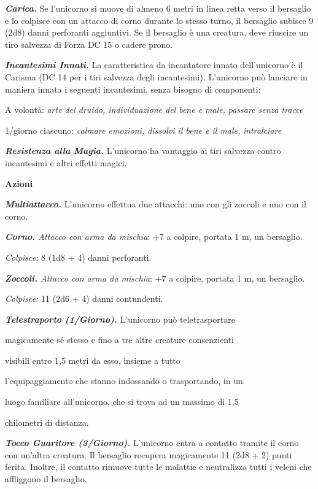 \begin{multicols}{2}
\emph{\textbf{Carica.}} Se l'unicorno si muove di almeno 6 metri in
linea retta verso il bersaglio e lo colpisce con un attacco di corno
durante lo stesso turno, il bersaglio subisce 9 (2d8) danni perforanti
aggiuntivi. Se il bersaglio è una creatura, deve riuscire un tiro
salvezza di Forza DC 15 o cadere prono.

\emph{\textbf{Incantesimi Innati.}} La caratteristica da incantatore
innato dell'unicorno è il Carisma (DC 14 per i tiri salvezza degli
incantesimi). L'unicorno può lanciare in maniera innata i seguenti
incantesimi, senza bisogno di componenti:

A volontà: \emph{arte del druido, individuazione del bene e male,}
\emph{passare senza tracce}

1/giorno ciascuno: \emph{calmare emozioni, dissolvi il bene e il male,}
\emph{intralciare}

\emph{\textbf{Resistenza alla Magia.}} L'unicorno ha vantaggio ai tiri
salvezza contro incantesimi e altri effetti magici.

\smallskip\textbf{Azioni}

\emph{\textbf{Multiattacco.}} L'unicorno effettua due attacchi: uno con
gli zoccoli e uno con il corno.

\emph{\textbf{Corno.} Attacco con arma da mischia}: +7 a colpire,
portata 1 m, un bersaglio.

\emph{Colpisce:} 8 (1d8 + 4) danni perforanti.

\emph{\textbf{Zoccoli.} Attacco con arma da mischia}: +7 a colpire,
portata 1 m, un bersaglio.

\emph{Colpisce:} 11 (2d6 + 4) danni contundenti.

\emph{\textbf{Telestraporto (1/Giorno).}} L'unicorno può teletrasportare

magicamente sé stesso e fino a tre altre creature consenzienti

visibili entro 1,5 metri da esso, insieme a tutto

l'equipaggiamento che stanno indossando o trasportando, in un

luogo familiare all'unicorno, che si trova ad un massimo di 1,5

chilometri di distanza.

\emph{\textbf{Tocco Guaritore (3/Giorno).}} L'unicorno entra a contatto
tramite il corno con un'altra creatura. Il bersaglio recupera
magicamente 11 (2d8 + 2) punti ferita. Inoltre, il contatto rimuove
tutte le malattie e neutralizza tutti i veleni che affliggono il
bersaglio.


\end{multicols}
